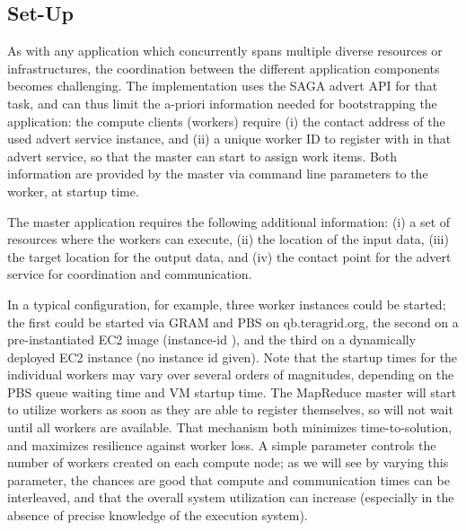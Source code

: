 \documentclass[3p,twocolumn]{elsarticle}
\begin{document}
\subsection{\sagamapreduce Set-Up}

As with any application which concurrently spans multiple diverse
resources or infrastructures, the coordination between the different
application components becomes challenging.  The \smr implementation
uses the SAGA advert API for that task, and can thus limit the a-priori
information needed for bootstrapping the application: the compute
clients (workers) require (i) the contact address of the used advert
service instance, and (ii) a unique worker ID to register with in that
advert service, so that the master can start to assign work items.
Both information are provided by the master via command line
parameters to the worker, at startup time.

The master application requires the following additional information:
(i) a set of resources where the workers can execute, (ii) the
location of the input data, (iii) the target location for the output
data, and (iv) the contact point for the advert service for
coordination and communication.

In a typical configuration, for example, three worker instances could
be started; the first could be started via GRAM and PBS on
qb.teragrid.org, the second on a pre-instantiated EC2 image
(instance-id ), and the third on a dynamically deployed
EC2 instance (no instance id given).  Note that the startup times for
the individual workers may vary over several orders of magnitudes,
depending on the PBS queue waiting time and VM startup time.  The
MapReduce master will start to utilize workers as soon as they are
able to register themselves, so will not wait until all workers are
available.  That mechanism both minimizes time-to-solution, and
maximizes resilience against worker loss.
%
%
A simple parameter controls the number of workers created on each
compute node; as we will see by varying this parameter, the chances
are good that compute and communication times can be interleaved, and
that the overall system utilization can increase (especially in the
absence of precise knowledge of the execution system).
\end{document}
